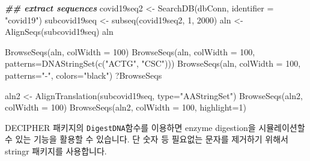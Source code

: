 \documentclass[
]{book}
\newenvironment{Shaded}{\begin{snugshade}}{\end{snugshade}}
\newcommand{\AttributeTok}[1]{\textcolor[rgb]{0.77,0.63,0.00}{#1}}
\newcommand{\DecValTok}[1]{\textcolor[rgb]{0.00,0.00,0.81}{#1}}
\newcommand{\DocumentationTok}[1]{\textcolor[rgb]{0.56,0.35,0.01}{\textbf{\textit{#1}}}}
\newcommand{\FunctionTok}[1]{\textcolor[rgb]{0.00,0.00,0.00}{#1}}
\newcommand{\NormalTok}[1]{#1}
\newcommand{\OtherTok}[1]{\textcolor[rgb]{0.56,0.35,0.01}{#1}}
\newcommand{\StringTok}[1]{\textcolor[rgb]{0.31,0.60,0.02}{#1}}
\begin{document}
\begin{Shaded}
\begin{Highlighting}[]

\DocumentationTok{\#\# extract sequences}
\NormalTok{covid19seq2 }\OtherTok{\textless{}{-}} \FunctionTok{SearchDB}\NormalTok{(dbConn, }\AttributeTok{identifier =} \StringTok{"covid19"}\NormalTok{)}
\NormalTok{subcovid19seq }\OtherTok{\textless{}{-}} \FunctionTok{subseq}\NormalTok{(covid19seq2, }\DecValTok{1}\NormalTok{, }\DecValTok{2000}\NormalTok{)}
\NormalTok{aln }\OtherTok{\textless{}{-}} \FunctionTok{AlignSeqs}\NormalTok{(subcovid19seq)}
\NormalTok{aln}

\FunctionTok{BrowseSeqs}\NormalTok{(aln, }\AttributeTok{colWidth =} \DecValTok{100}\NormalTok{)}
\FunctionTok{BrowseSeqs}\NormalTok{(aln, }\AttributeTok{colWidth =} \DecValTok{100}\NormalTok{, }\AttributeTok{patterns=}\FunctionTok{DNAStringSet}\NormalTok{(}\FunctionTok{c}\NormalTok{(}\StringTok{"ACTG"}\NormalTok{, }\StringTok{"CSC"}\NormalTok{)))}
\FunctionTok{BrowseSeqs}\NormalTok{(aln, }\AttributeTok{colWidth =} \DecValTok{100}\NormalTok{, }\AttributeTok{patterns=}\StringTok{"{-}"}\NormalTok{, }\AttributeTok{colors=}\StringTok{"black"}\NormalTok{)}
\NormalTok{?BrowseSeqs}

\NormalTok{aln2 }\OtherTok{\textless{}{-}} \FunctionTok{AlignTranslation}\NormalTok{(subcovid19seq, }\AttributeTok{type=}\StringTok{"AAStringSet"}\NormalTok{)}
\FunctionTok{BrowseSeqs}\NormalTok{(aln2, }\AttributeTok{colWidth =} \DecValTok{100}\NormalTok{)}
\FunctionTok{BrowseSeqs}\NormalTok{(aln2, }\AttributeTok{colWidth =} \DecValTok{100}\NormalTok{, }\AttributeTok{highlight=}\DecValTok{1}\NormalTok{)}
\end{Highlighting}
\end{Shaded}

DECIPHER 패키지의 \texttt{DigestDNA}함수를 이용하면 enzyme digestion을 시뮬레이션할 수 있는 기능을 활용할 수 있습니다. 단 숫자 등 필요없는 문자를 제거하기 위해서 stringr 패키지를 사용합니다.
\end{document}
